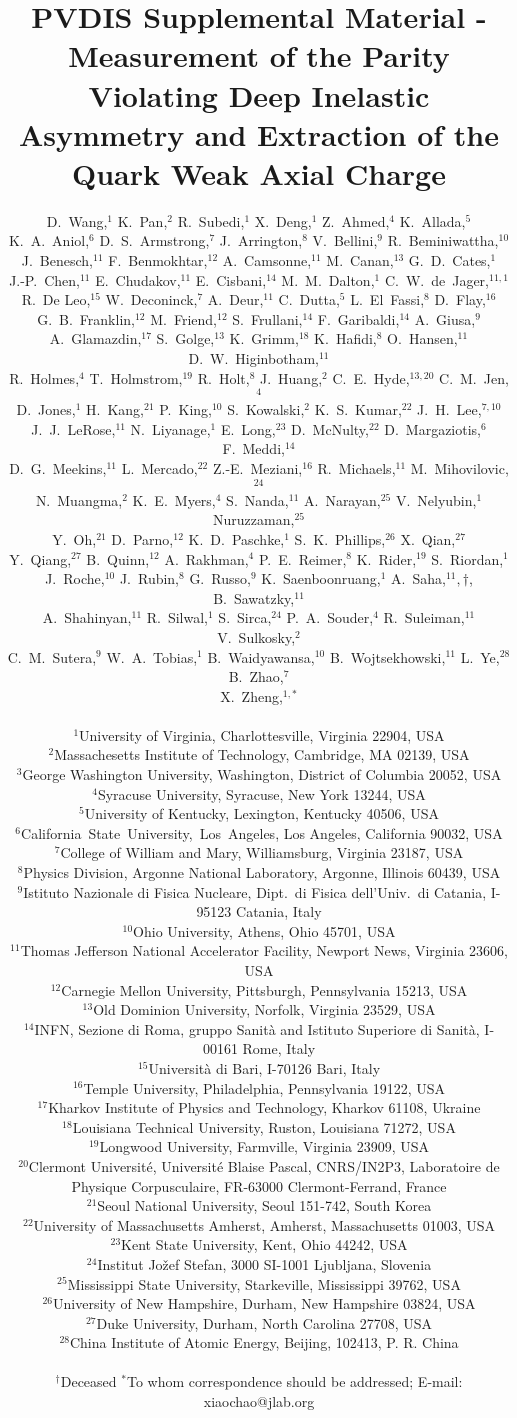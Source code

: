 \documentclass[12pt]{article}
\title{PVDIS Supplemental Material - Measurement of the Parity Violating
Deep Inelastic Asymmetry and Extraction of the Quark Weak Axial Charge}
\author{
D.~Wang,$^{1}$  K.~Pan,$^{2}$  R.~Subedi,$^{1}$  X.~Deng,$^{1}$  Z.~Ahmed,$^{4}$  K.~Allada,$^{5}$  \\
K.~A.~Aniol,$^{6}$  D.~S.~Armstrong,$^{7}$  J.~Arrington,$^{8}$  V.~Bellini,$^{9}$  R.~Beminiwattha,$^{10}$  \\
J.~Benesch,$^{11}$  F.~Benmokhtar,$^{12}$  A.~Camsonne,$^{11}$  M.~Canan,$^{13}$  G.~D.~Cates,$^{1}$  \\
J.-P.~Chen,$^{11}$  E.~Chudakov,$^{11}$  E.~Cisbani,$^{14}$  M.~M.~Dalton,$^{1}$  C.~W.~de~Jager,$^{11,1}$  \\
R.~De Leo,$^{15}$  W.~Deconinck,$^{7}$  A.~Deur,$^{11}$  C.~Dutta,$^{5}$  L.~El~Fassi,$^{8}$  D.~Flay,$^{16}$  \\
G.~B.~Franklin,$^{12}$  M.~Friend,$^{12}$  S.~Frullani,$^{14}$  F.~Garibaldi,$^{14}$  A.~Giusa,$^{9}$  \\
A.~Glamazdin,$^{17}$  S.~Golge,$^{13}$  K.~Grimm,$^{18}$  K.~Hafidi,$^{8}$  O.~Hansen,$^{11}$  D.~W.~Higinbotham,$^{11}$  \\
R.~Holmes,$^{4}$  T.~Holmstrom,$^{19}$  R.~Holt,$^{8}$  J.~Huang,$^{2}$  C.~E.~Hyde,$^{13,20}$  C.~M.~Jen,$^{4}$  \\
D.~Jones,$^{1}$  H.~Kang,$^{21}$  P.~King,$^{10}$  S.~Kowalski,$^{2}$  K.~S.~Kumar,$^{22}$  J.~H.~Lee,$^{7,10}$  \\
J.~J.~LeRose,$^{11}$  N.~Liyanage,$^{1}$  E.~Long,$^{23}$  D.~McNulty,$^{22}$  D.~Margaziotis,$^{6}$  F.~Meddi,$^{14}$  \\
D.~G.~Meekins,$^{11}$  L.~Mercado,$^{22}$  Z.-E.~Meziani,$^{16}$  R.~Michaels,$^{11}$  M.~Mihovilovic,$^{24}$  \\
N.~Muangma,$^{2}$  K.~E.~Myers,$^{4}$  S.~Nanda,$^{11}$  A.~Narayan,$^{25}$  V.~Nelyubin,$^{1}$  Nuruzzaman,$^{25}$  \\
Y.~Oh,$^{21}$  D.~Parno,$^{12}$  K.~D.~Paschke,$^{1}$  S.~K.~Phillips,$^{26}$  X.~Qian,$^{27}$  \\
Y.~Qiang,$^{27}$  B.~Quinn,$^{12}$  A.~Rakhman,$^{4}$  P.~E.~Reimer,$^{8}$  K.~Rider,$^{19}$  S.~Riordan,$^{1}$  \\
J.~Roche,$^{10}$  J.~Rubin,$^{8}$  G.~Russo,$^{9}$  K.~Saenboonruang,$^{1}$  A.~Saha,$^{11},\dagger$, B.~Sawatzky,$^{11}$  \\
A.~Shahinyan,$^{11}$  R.~Silwal,$^{1}$  S.~Sirca,$^{24}$  P.~A.~Souder,$^{4}$  R.~Suleiman,$^{11}$  V.~Sulkosky,$^{2}$  \\
C.~M.~Sutera,$^{9}$  W.~A.~Tobias,$^{1}$  B.~Waidyawansa,$^{10}$  B.~Wojtsekhowski,$^{11}$  L.~Ye,$^{28}$  B.~Zhao,$^{7}$  \\
X.~Zheng,$^{1,\ast}$\\
\\
\normalsize{$^{1}$University of Virginia, Charlottesville, Virginia 22904, USA} \\
\normalsize{$^{2}$Massachesetts Institute of Technology, Cambridge, MA 02139, USA}\\
\normalsize{$^{3}$George Washington University, Washington, District of Columbia 20052, USA}\\
\normalsize{$^{4}$Syracuse University, Syracuse, New York 13244, USA}\\
\normalsize{$^{5}$University of Kentucky, Lexington, Kentucky 40506, USA}\\
\normalsize{$^{6}$\mbox{California State University, Los Angeles}, Los Angeles, California 90032, USA}\\
\normalsize{$^{7}$College of William and Mary, Williamsburg, Virginia 23187, USA}\\
\normalsize{$^{8}$Physics Division, Argonne National Laboratory, Argonne, Illinois 60439, USA}\\
\normalsize{$^{9}$Istituto Nazionale di Fisica Nucleare, Dipt.~di Fisica dell'Univ.~di Catania, I-95123 Catania, Italy}\\
\normalsize{$^{10}$Ohio University, Athens, Ohio 45701, USA}\\
\normalsize{$^{11}$Thomas Jefferson National Accelerator Facility, Newport News, Virginia 23606, USA}\\
\normalsize{$^{12}$Carnegie Mellon University, Pittsburgh, Pennsylvania 15213, USA}\\
\normalsize{$^{13}$Old Dominion University, Norfolk, Virginia 23529, USA}\\
\normalsize{$^{14}$INFN, Sezione di Roma, gruppo Sanit\`a and Istituto Superiore di Sanit\`a, I-00161 Rome, Italy}\\
\normalsize{$^{15}$Universit\`a di Bari, I-70126 Bari, Italy}\\
\normalsize{$^{16}$Temple University, Philadelphia, Pennsylvania 19122, USA}\\
\normalsize{$^{17}$Kharkov Institute of Physics and Technology, Kharkov 61108, Ukraine}\\
\normalsize{$^{18}$Louisiana Technical University, Ruston, Louisiana 71272, USA}\\
\normalsize{$^{19}$Longwood University, Farmville, Virginia 23909, USA}\\
\normalsize{$^{20}$Clermont Universit\'e, Universit\'e Blaise Pascal, CNRS/IN2P3,
Laboratoire de Physique Corpusculaire, FR-63000 Clermont-Ferrand, France}\\
\normalsize{$^{21}$Seoul National University, Seoul 151-742, South Korea}\\
\normalsize{$^{22}$University of Massachusetts Amherst, Amherst, Massachusetts 01003, USA}\\
\normalsize{$^{23}$Kent State University, Kent, Ohio 44242, USA} \\
\normalsize{$^{24}$Institut Jo\v zef Stefan, 3000 SI-1001 Ljubljana, Slovenia}\\
\normalsize{$^{25}$Mississippi State University, Starkeville, Mississippi 39762, USA}\\
\normalsize{$^{26}$University of New Hampshire, Durham, New Hampshire 03824, USA}\\
\normalsize{$^{27}$Duke University, Durham, North Carolina 27708, USA}\\
\normalsize{$^{28}$China Institute of Atomic Energy, Beijing, 102413, P. R. China}\\\\
%
\normalsize{$^\dagger$Deceased}
\normalsize{$^\ast$To whom correspondence should be addressed; E-mail: xiaochao@jlab.org}
%
}
\date{}
\newenvironment{sciabstract}{%
\begin{quote} \bf}
{\end{quote}}
\begin{document}
 


\baselineskip24pt


\maketitle 




\begin{sciabstract}

\end{sciabstract}






















\end{document}
